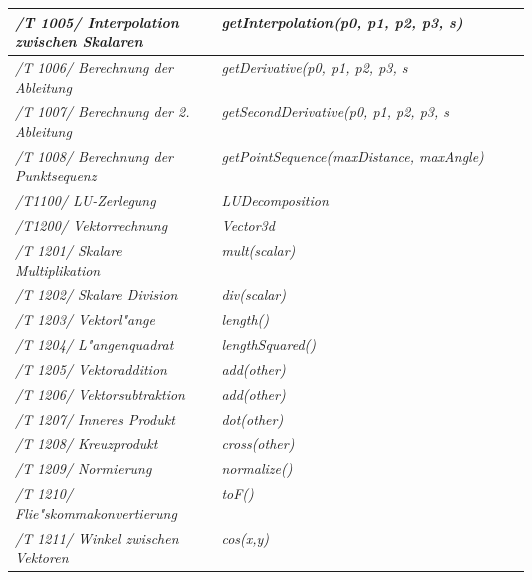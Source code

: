 \begin{longtable}{|p{.3\linewidth}|p{0.6\linewidth}|}
\textit{ /T 1005/ Interpolation zwischen Skalaren} &  \textit{getInterpolation(p0, p1, p2, p3, s)}\\\hline

\textit{ /T 1006/ Berechnung der Ableitung} &  \textit{getDerivative(p0, p1, p2, p3, s}\\\hline

\textit{ /T 1007/ Berechnung der 2. Ableitung} &  \textit{getSecondDerivative(p0, p1, p2, p3, s}\\\hline

\textit{ /T 1008/ Berechnung der Punktsequenz} &  \textit{getPointSequence(maxDistance, maxAngle)}\\\hline

\textit{/T1100/ LU-Zerlegung}  &  \textit{LUDecomposition}\\\hline

\textit{/T1200/ Vektorrechnung} &  \textit{Vector3d}\\\hline

\textit{/T 1201/ Skalare Multiplikation} & \textit{mult(scalar)}\\\hline

\textit{ /T 1202/ Skalare Division} &  \textit{div(scalar)}\\\hline

\textit{ /T 1203/ Vektorl"ange} &  \textit{length()}\\\hline

\textit{ /T 1204/ L"angenquadrat} &  \textit{lengthSquared()}\\\hline

\textit{ /T 1205/ Vektoraddition} &  \textit{add(other)}\\\hline

\textit{ /T 1206/ Vektorsubtraktion} &  \textit{add(other)}\\\hline

\textit{ /T 1207/ Inneres Produkt} &  \textit{dot(other)}\\\hline

\textit{ /T 1208/ Kreuzprodukt} &  \textit{cross(other)}\\\hline

\textit{ /T 1209/ Normierung} & \textit{normalize()}\\\hline

\textit{ /T 1210/ Flie"skommakonvertierung} &  \textit{toF()}\\\hline

\textit{ /T 1211/ Winkel zwischen Vektoren}  &  \textit{cos(x,y)}\\\hline


\end{longtable}
